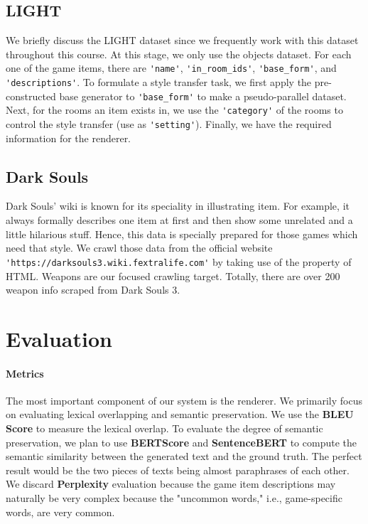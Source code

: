\documentclass[11pt]{article}
\begin{document}
  \subsection{LIGHT} We briefly discuss the LIGHT dataset since we frequently work with this dataset throughout
    this course. At this stage, we only use the objects dataset. For each one of the game items, there are 
    \lstinline{'name'}, \lstinline{'in_room_ids'}, \lstinline{'base_form'}, and \lstinline{'descriptions'}. 
    To formulate a style transfer task, we first apply 
    the pre-constructed base generator to \lstinline{'base_form'} to make a pseudo-parallel dataset. 
    Next, for the rooms an item exists in, we use the \lstinline{'category'} of the rooms to control the 
    style transfer (use as \lstinline{'setting'}). Finally, we have the required information for the renderer.
    
  \subsection{Dark Souls} Dark Souls' wiki is known for its speciality in illustrating item. For example, it always formally describes one item at first and then show some unrelated and a little hilarious stuff. Hence, this data is specially prepared for those games which need that style. We crawl those data from the official website \lstinline{'https://darksouls3.wiki.fextralife.com'} by taking use of the property of HTML. Weapons are our focused crawling target. Totally, there are over 200 weapon info scraped from Dark Souls 3.

\section{Evaluation}

\paragraph{Metrics} The most important component of our system is the renderer. We primarily focus on evaluating lexical overlapping and semantic preservation. We use the \textbf{BLEU Score} \cite{papineni-etal-2002-bleu} to measure the lexical overlap. To evaluate the degree of semantic preservation, we plan to use \textbf{BERTScore} \cite{bert-score} and \textbf{SentenceBERT} \cite{reimers-2019-sentence-bert} to compute the semantic similarity between the generated text and the ground truth. The perfect result would be the two pieces of texts being almost paraphrases of each other. We discard \textbf{Perplexity} evaluation because the game item descriptions may naturally be very complex because the "uncommon words," i.e., game-specific words, are very common. 
\end{document}
